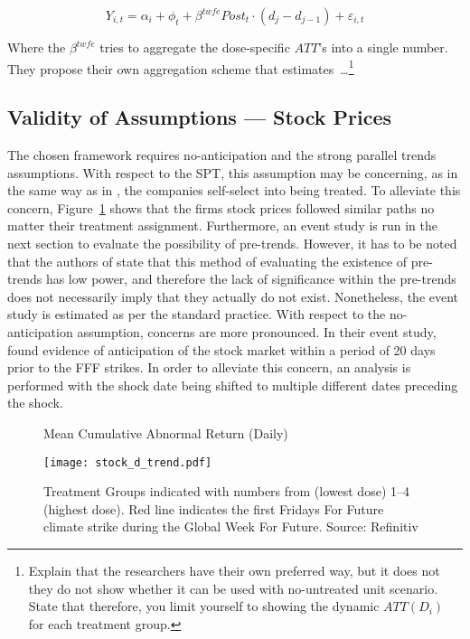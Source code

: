 \documentclass[12pt]{article}
\begin{document}
\begin{equation}
    Y_{i,t} = \alpha_i + \phi_t +  \beta^{twfe} Post_t \cdot (d_j - d_{j-1}) + \varepsilon_{i,t}
\end{equation}

Where the $\beta^{twfe}$ tries to aggregate the dose-specific $ATT$'s into a single number. They propose their own aggregation scheme that estimates\ \dots\footnote{Explain that the researchers have their own preferred way, but it does not they do not show whether it can be used with no-untreated unit scenario. State that therefore, you limit yourself to showing the dynamic $ATT(D_i)$ for each treatment group.}

\subsection{Validity of Assumptions --- Stock Prices}

The chosen framework requires no-anticipation and the strong parallel trends assumptions. With respect to the SPT, this assumption may be concerning, as in the same way as in \textcite{koenigImpulsePurchasesGun2023}, the companies self-select into being treated. To alleviate this concern, Figure~\ref{fig:stock_trend} shows that the firms stock prices followed similar paths no matter their treatment assignment.
Furthermore, an event study is run in the next section to evaluate the possibility of pre-trends. However, it has to be noted that the authors of \textcite{callawayDifferenceindifferencesContinuousTreatment2024} state that this method of evaluating the existence of pre-trends has low power, and therefore the lack of significance within the pre-trends does not necessarily imply that they actually do not exist. Nonetheless, the event study is estimated as per the standard practice.
With respect to the no-anticipation assumption, concerns are more pronounced. In their event study, \textcite{schusterStockPriceReactions2023} found evidence of anticipation of the stock market within a period of 20 days prior to the FFF strikes. In order to alleviate this concern, an analysis is performed with the shock date being shifted to multiple different dates preceding the shock.

\begin{figure}[t]
    \caption{Mean Cumulative Abnormal Return (Daily)}\label{fig:stock_trend}
    \centering
    \texttt{[image: stock\_d\_trend.pdf]}
    \captionsetup{font=footnotesize}
    \caption*{Treatment Groups indicated with numbers from (lowest dose) 1--4 (highest dose). Red line indicates the first Fridays For Future climate strike during the Global Week For Future. Source: Refinitiv}
\end{figure}
\end{document}
